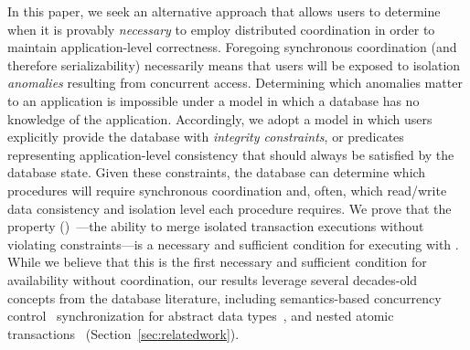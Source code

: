 In this paper, we seek an alternative approach that allows users to
determine when it is provably \textit{necessary} to employ distributed
coordination in order to maintain application-level
correctness. Foregoing synchronous coordination (and therefore
serializability) necessarily means that users will be exposed to
isolation \textit{anomalies} resulting from concurrent
access. Determining which anomalies matter to an application is
impossible under a model in which a database has no knowledge of the
application. Accordingly, we adopt a model in which users explicitly
provide the database with \textit{integrity constraints}, or
predicates representing application-level consistency that should
always be satisfied by the database state. Given these constraints,
the database can determine which procedures will require synchronous
coordination and, often, which read/write data consistency and
isolation level each procedure requires. We prove that the
\textit{\fullnameconfluence} property
(\iconfluence)~\cite{obs-confluence}---the ability to merge isolated
transaction executions without violating constraints---is a necessary
and sufficient condition for executing with \cfreedom. While we
believe that this is the first necessary and sufficient condition for
availability without coordination, our results leverage several
decades-old concepts from the database literature, including
semantics-based concurrency
control~\cite{sdd1,decomp-semantics,badrinath-semantics,garciamolina-semantics,korth-serializability}
synchronization for abstract data
types~\cite{herlihy-apologizing,weihl-thesis}, and nested atomic
transactions~\cite{atomictransactions}
(Section~\ref{sec:relatedwork}).

